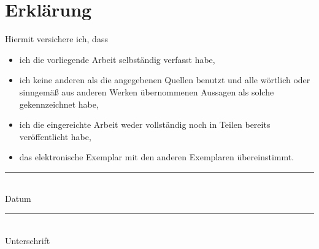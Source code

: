 %
%
\cleardoublepage %
\chapter*{Erklärung}

Hiermit versichere ich, dass
\begin{itemize}
 \item ich die vorliegende Arbeit selbständig verfasst habe,
 \item ich keine anderen als die angegebenen Quellen benutzt und alle wörtlich oder sinngemäß aus anderen Werken übernommenen Aussagen als solche gekennzeichnet habe,
 \item ich die eingereichte Arbeit weder vollständig noch in Teilen bereits veröffentlicht habe,
 \item das elektronische Exemplar mit den anderen Exemplaren übereinstimmt.
\end{itemize}
\vspace*{2cm}
\begin{center}
   \begin{minipage}{0.3\textwidth}
      \centering
      \rule{4cm}{0.2mm}\\
      Datum
   \end{minipage}\hfill
   \begin{minipage}{0.6\textwidth}
      \centering
      \rule{8cm}{0.2mm}\\
      Unterschrift
   \end{minipage}
\end{center}
\vfill
